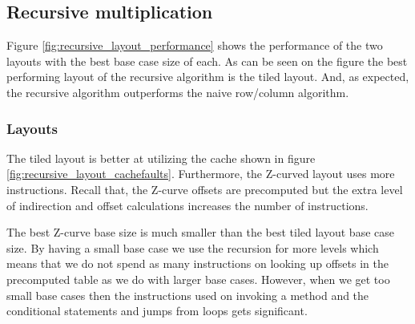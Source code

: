 

\subsection{Recursive multiplication}

Figure \ref{fig:recursive_layout_performance} shows the performance of the two layouts with the best base case size of each. As can be seen on the figure the best performing layout of the recursive algorithm is the tiled layout. And, as expected, the recursive algorithm outperforms the naive row/column algorithm.

\subsubsection{Layouts}

The tiled layout is better at utilizing the cache shown in figure \ref{fig:recursive_layout_cachefaults}. Furthermore, the Z-curved layout uses more instructions. Recall that, the Z-curve offsets are precomputed but the extra level of indirection and offset calculations increases the number of instructions.

The best Z-curve base size is much smaller than the best tiled layout base case size. By having a small base case we use the recursion for more levels which means that we do not spend as many instructions on looking up offsets in the precomputed table as we do with larger base cases. However, when we get too small base cases then the instructions used on invoking a method and the conditional statements and jumps from loops gets significant.





